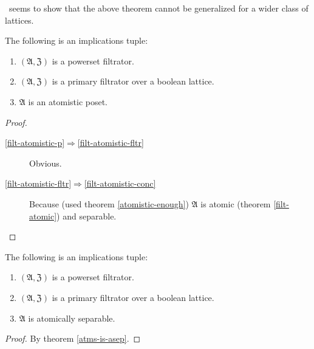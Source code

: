 \begin{rem}
 \cite{2832846}~seems to show that the above theorem cannot
 be generalized for a wider class of lattices.
\end{rem}

\begin{thm}
\label{filt-atomistic}The following is an implications tuple:
\begin{enumerate}
\item \label{filt-atomistic-p}$(\mathfrak{A},\mathfrak{Z})$ is a powerset
filtrator.
\item \label{filt-atomistic-fltr}$(\mathfrak{A},\mathfrak{Z})$ is a primary
filtrator over a boolean lattice.
\item \label{filt-atomistic-conc}$\mathfrak{A}$ is an atomistic poset.
\end{enumerate}
\end{thm}
\begin{proof}
~
\begin{description}
\item [{\ref{filt-atomistic-p}$\Rightarrow$\ref{filt-atomistic-fltr}}] Obvious.
\item [{\ref{filt-atomistic-fltr}$\Rightarrow$\ref{filt-atomistic-conc}}] Because
(used theorem \ref{atomistic-enough}) $\mathfrak{A}$ is atomic
(theorem \ref{filt-atomic}) and separable.
\end{description}
\end{proof}
\begin{cor}
\label{f-atom-sep}The following is an implications tuple:
\begin{enumerate}
\item $(\mathfrak{A},\mathfrak{Z})$ is a powerset filtrator.
\item $(\mathfrak{A},\mathfrak{Z})$ is a primary filtrator over a boolean
lattice.
\item $\mathfrak{A}$ is atomically separable.
\end{enumerate}
\end{cor}
\begin{proof}
By theorem \ref{atms-is-asep}.
\end{proof}

